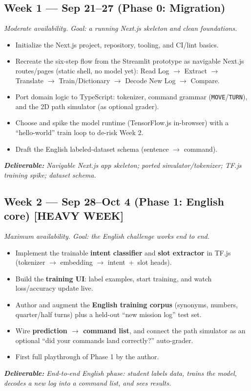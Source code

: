 \documentclass[a4]{article}
\newcommand{\deliv}[1]{\textit{\textbf{Deliverable:} #1}}
\begin{document}
\subsection*{Week 1 --- Sep 21--27 \quad (Phase 0: Migration)}
\emph{Moderate availability. Goal: a running Next.js skeleton and clean foundations.}
\begin{itemize}[leftmargin=*, itemsep=1pt]
    \item Initialize the Next.js project, repository, tooling, and CI/lint basics.
    \item Recreate the six-step flow from the Streamlit prototype as navigable
    Next.js routes/pages (static shell, no model yet): Read Log $\rightarrow$
    Extract $\rightarrow$ Translate $\rightarrow$ Train/Dictionary $\rightarrow$
    Decode New Log $\rightarrow$ Compare.
    \item Port domain logic to TypeScript: tokenizer, command grammar
    (\texttt{MOVE}/\texttt{TURN}), and the 2D path simulator (as optional grader).
    \item Choose and spike the model runtime (TensorFlow.js in-browser) with a
    ``hello-world'' train loop to de-risk Week 2.
    \item Draft the English labeled-dataset schema (sentence $\rightarrow$ command).
\end{itemize}
\deliv{Navigable Next.js app skeleton; ported simulator/tokenizer; TF.js training spike; dataset schema.}

\subsection*{Week 2 --- Sep 28--Oct 4 \quad (Phase 1: English core) \hfill \textcolor{orange!80!black}{\textbf{[HEAVY WEEK]}}}
\emph{Maximum availability. Goal: the English challenge works end to end.}
\begin{itemize}[leftmargin=*, itemsep=1pt]
    \item Implement the trainable \textbf{intent classifier} and \textbf{slot
    extractor} in TF.js (tokenizer $\rightarrow$ embedding $\rightarrow$
    intent~+~slot heads).
    \item Build the \textbf{training UI}: label examples, start training, and watch
    loss/accuracy update live.
    \item Author and augment the \textbf{English training corpus} (synonyms,
    numbers, quarter/half turns) plus a held-out ``new mission log'' test set.
    \item Wire \textbf{prediction $\rightarrow$ command list}, and connect the path
    simulator as an optional ``did your commands land correctly?'' auto-grader.
    \item First full playthrough of Phase 1 by the author.
\end{itemize}
\deliv{End-to-end English phase: student labels data, trains the model, decodes a new log into a command list, and sees results.}
\end{document}
